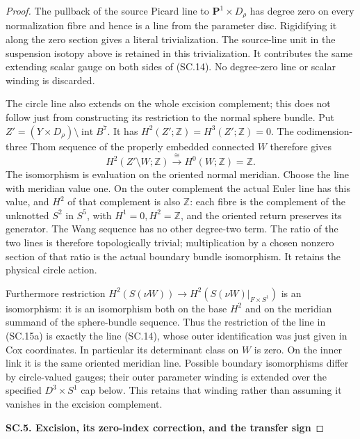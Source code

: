 \begin{proof}
The pullback of the source Picard line to
\(\mathbf P^1\times D_\rho\) has degree zero on every normalization
fibre and hence is a line from the parameter disc. Rigidifying it along
the zero section gives a literal trivialization. The source-line unit
in the suspension isotopy above is retained in this trivialization.
It contributes the same extending scalar gauge on both sides of
(SC.14). No degree-zero line or scalar winding is discarded.

The circle line also extends on the whole excision complement; this
does not follow just from constructing its restriction to the normal
sphere bundle. Put \(Z'= (Y\times D_\rho)\setminus\operatorname{int}B^7\).
It has \(H^2(Z';\mathbb Z)=H^3(Z';\mathbb Z)=0\). The codimension-three
Thom sequence of the properly embedded connected \(W\) therefore gives
\[
 H^2(Z'\setminus W;\mathbb Z)\xrightarrow{\ \cong\ }
             H^0(W;\mathbb Z)=\mathbb Z.             \tag{SC.15a}
\]
The isomorphism is evaluation on the oriented normal meridian. Choose
the line with meridian value one. On the outer complement the actual
Euler line has this value, and \(H^2\) of that complement is also
\(\mathbb Z\): each fibre is the complement of the unknotted \(S^2\)
in \(S^5\), with \(H^1=0,H^2=\mathbb Z\), and the oriented return
preserves its generator. The Wang sequence has no other degree-two
term. The ratio of the two lines is therefore topologically trivial;
multiplication by a chosen nonzero section of that ratio is the actual
boundary bundle isomorphism. It retains the physical circle action.

Furthermore restriction
\(H^2(S(\nu W))\to H^2(S(\nu W)|_{F\times S^1})\) is an isomorphism:
it is an isomorphism both on the base \(H^2\) and on the meridian
summand of the sphere-bundle sequence. Thus the restriction of the line
in (SC.15a) is exactly the line (SC.14), whose outer identification was
just given in Cox coordinates. In particular its determinant class on
\(W\) is zero. On the inner link it is the same oriented meridian line.
Possible boundary isomorphisms differ by circle-valued gauges; their
outer parameter winding is extended over the specified
\(D^3\times S^1\) cap below. This retains that winding rather than
assuming it vanishes in the excision complement.

\par

\medskip\noindent\textbf{SC.5. Excision, its zero-index correction, and the transfer sign}

\par\nobreak


\end{proof}
